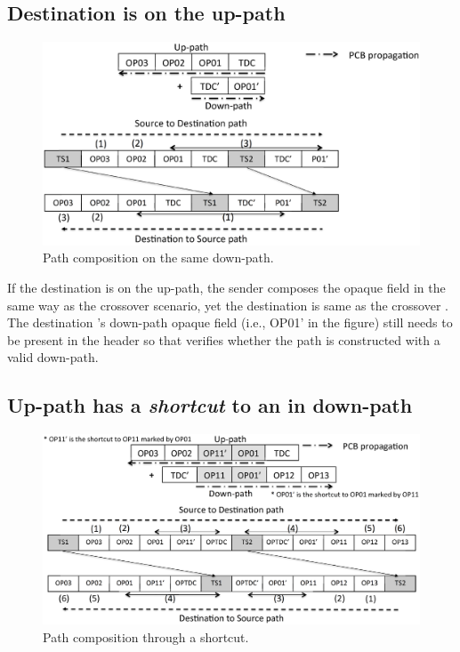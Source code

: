 \subsection{Destination \AD is on the up-path}

\begin{figure}[h]
\centering
\includegraphics[width=.9\columnwidth]{./fig/nex_fwd3.eps}
\caption{Path composition on the same down-path.}\label{fig:ex-fwd-onpath}
\end{figure}

\noindent If the destination \AD is on the up-path, the sender composes the opaque field in the same way as the crossover scenario, yet the destination \AD is same as the crossover \AD. The destination \AD's down-path opaque field (i.e., OP01' in the figure) still needs to be present in the header so that  verifies whether the path is constructed with a valid down-path.

\subsection{Up-path has a {\em shortcut} to an \AD in down-path}

\begin{figure}[h]
\centering
\includegraphics[width=.9\columnwidth]{./fig/nex_fwd4.eps}
\caption{Path composition through a shortcut.}\label{fig:ex-fwd-shortcut}
\end{figure}


